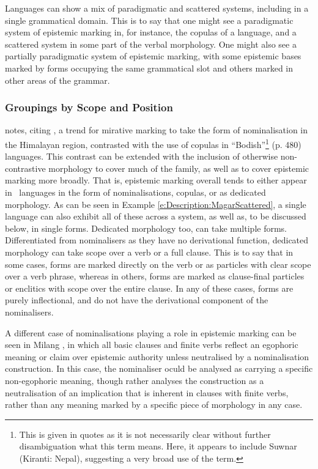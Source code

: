 Languages can show a mix of paradigmatic and scattered systems, including in a single grammatical domain. This is to say that one might see a paradigmatic system of epistemic marking in, for instance, the copulas of a language, and a scattered system in some part of the verbal morphology. One might also see a partially paradigmatic system of epistemic marking, with some epistemic bases marked by forms occupying the same grammatical slot and others marked in other areas of the grammar.

\subsubsection{Groupings by Scope and Position}\label{sss:Description:ScopePosition}
 notes, citing , a trend for mirative marking to take the form of nominalisation in the Himalayan region, contrasted with the use of copulas in ``Bodish''\footnote{This is given in quotes as it is not necessarily clear without further disambiguation what this term means. Here, it appears to include Suwnar (Kiranti: Nepal), suggesting a very broad use of the term.} (p. 480) languages. This contrast can be extended with the inclusion of otherwise non-contrastive morphology to cover much of the family, as well as to cover epistemic marking more broadly. That is, epistemic marking overall tends to either appear in \lfam\ languages in the form of nominalisations, copulas, or as dedicated morphology. As can be seen in Example \ref{e:Description:MagarScattered}, a single language can also exhibit all of these across a system, as well as, to be discussed below, in single forms. Dedicated morphology too, can take multiple forms. Differentiated from nominalisers as they have no derivational function, dedicated morphology can take scope over a verb or a full clause. This is to say that in some cases, forms are marked directly on the verb or as particles with clear scope over a verb phrase, whereas in others, forms are marked as clause-final particles or enclitics with scope over the entire clause. In any of these cases, forms are purely inflectional, and do not have the derivational component of the nominalisers.


A different case of nominalisations playing a role in epistemic marking can be seen in Milang \cite[Siangic: India,][]{Modi2017}, in which all basic clauses and finite verbs reflect an egophoric meaning or claim over epistemic authority unless neutralised by a nominalisation construction. In this case, the nominaliser oculd be analysed as carrying a specific non-egophoric meaning, though  rather analyses the construction as a neutralisation of an implication that is inherent in clauses with finite verbs, rather than any meaning marked by a specific piece of morphology in any case.

